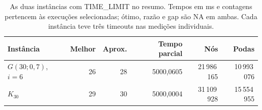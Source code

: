 \begin{table}[htbp]
\centering
\caption{As duas instâncias com TIME\_LIMIT no resumo. Tempos em ms e contagens pertencem às execuções selecionadas; ótimo, razão e gap são NA em ambas. Cada instância teve três timeouts nas medições individuais.}
\label{tab:timeouts}
\small
\setlength{\tabcolsep}{4pt}
\begin{tabular}{lrrrrr}
\toprule
Instância & Melhor & Aprox. & Tempo parcial & Nós & Podas \\
\midrule
$G(30;0{,}7)$, $i=6$ & 26 & 28 & 5000,0605 & 21\,986\,165 & 10\,993\,076 \\
$K_{30}$ & 29 & 30 & 5000,0004 & 31\,109\,928 & 15\,554\,955 \\
\bottomrule
\end{tabular}
\end{table}
